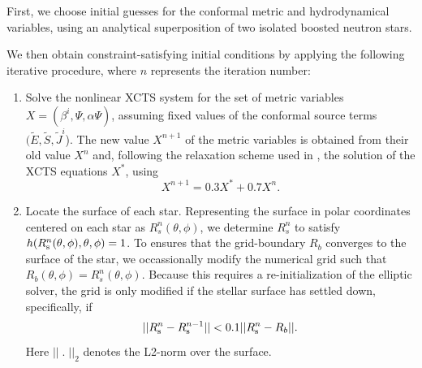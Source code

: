 {First, we choose initial guesses
for the conformal metric and hydrodynamical variables, using an
analytical superposition of two isolated boosted neutron stars.

We then obtain constraint-satisfying initial conditions by applying
the following iterative procedure, where $n$ represents the iteration number:
\begin{enumerate}
\item \label{step:1} 
  Solve the nonlinear XCTS system for the set of metric variables $X=(\beta^i,\Psi,\alpha \Psi)$,
  assuming fixed values of the conformal source terms
  $(\tilde{E},\tilde{S},\tilde{J}^i$). The new value $X^{n+1}$ of the
  metric variables is obtained from their old value $X^n$ and,
  following the relaxation scheme used in \cite{FoucartEtAl:2008}, the
  solution of the XCTS equations $X^*$, using
\begin{equation}
\label{eq:Relaxation}
X^{n+1}=0.3X^*+0.7X^n.
\end{equation}
\item Locate the surface of each star.  Representing the surface in polar coordinates centered on each star as $R_s^n(\theta,\phi)$, we determine $R_s^n$ to satisfy~\cite{FoucartEtAl:2008} $h(R^n_{\rm
  s}(\theta,\phi),\theta,\phi)=1$.
To ensures that the grid-boundary $R_b$ converges to the surface of the star, we occassionally modify the numerical grid such that $R_b(\theta,\phi)=R^n_s(\theta,\phi)$. Because this requires a re-initialization of the elliptic solver, the grid is only modified if the stellar surface has settled down, specifically, if
\begin{equation}
||R^n_{\rm s} - R^{n-1}_{\rm s}|| < 0.1 ||R^n_{\rm s} - R_b||.
\end{equation}
Here $||\;.\;||_2$ denotes the L2-norm over the surface.


\end{enumerate}}
